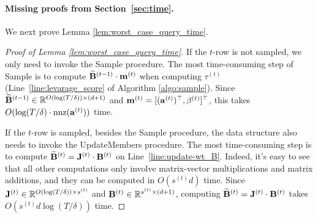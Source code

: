 \paragraph{Missing proofs from Section~\ref{sec:time}.}
We next prove Lemma \ref{lem:worst_case_query_time}.
\begin{proof}[Proof of Lemma \ref{lem:worst_case_query_time}]
If the $t$-row is not sampled, we only need to invoke the {\sc Sample} procedure. The most time-consuming step of {\sc Sample} is to compute $\widetilde{\mathbf{B}}^{(t-1)} \cdot \mathbf{m}^{(t)}$ when computing $\tau^{(t)}$ (Line~\ref{line:levarage_score} of Algorithm \ref{algo:sample}). Since $\widetilde{\mathbf{B}}^{(t-1)} \in \mathbb{R}^{O(\log(T/\delta)) \times (d+1)}$ and $\mathbf{m}^{(t)} = [(\mathbf{a}^{(t)})^{\top}, \beta^{(t)}]^{\top}$, this takes $O(\log(T/\delta) \cdot \operatorname{nnz}(\mathbf{a}^{(t)}))$ time.

If the $t$-row is sampled, besides the {\sc Sample} procedure, the data structure also needs to invoke the {\sc UpdateMembers} procedure. 
The most time-consuming step is to compute $\widetilde{\mathbf{B}}^{(t)} = \mathbf{J}^{(t)} \cdot \mathbf{B}^{(t)}$ on Line~\ref{line:update-wt_B}. Indeed, it's easy to see that all other computations only involve matrix-vector multiplications and matrix additions, and they can be computed in $O(s^{(t)} d)$ time.
Since $\mathbf{J}^{(t)} \in \mathbb{R}^{O(\log(T/\delta)) \times s^{(t)}}$ and $\mathbf{B}^{(t)} \in \mathbb{R}^{s^{(t)} \times (d+1)}$, computing $\widetilde{\mathbf{B}}^{(t)} = \mathbf{J}^{(t)} \cdot \mathbf{B}^{(t)}$ takes $O(s^{(t)} d \log(T/\delta))$ time.
\end{proof}

